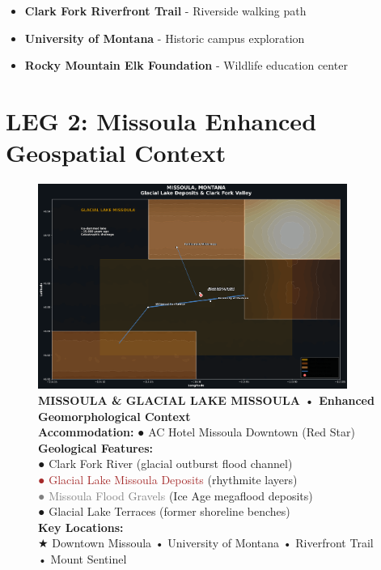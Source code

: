 \documentclass[
  11pt,
]{article}
\providecommand{\tightlist}{%
  \setlength{\itemsep}{0pt}\setlength{\parskip}{0pt}}
\begin{document}
\begin{itemize}
\tightlist
\item
  \textbf{\textcolor{secondary}{Clark Fork Riverfront Trail}} -
  Riverside walking path
\item
  \textbf{\textcolor{secondary}{University of Montana}} - Historic
  campus exploration
\item
  \textbf{\textcolor{secondary}{Rocky Mountain Elk Foundation}} -
  Wildlife education center
\end{itemize}

\newpage

\section{\texorpdfstring{\textcolor{primary}{LEG 2: Missoula Enhanced Geospatial Context}}{}}\label{section-16}

\begin{figure}[H]
\centering
\includegraphics[width=0.9\textwidth]{images/missoula_enhanced_geospatial.png}
\caption{\textbf{\textcolor{primary}{MISSOULA \& GLACIAL LAKE MISSOULA • Enhanced Geomorphological Context}} \\ 
\textbf{\textcolor{secondary}{Accommodation:}} \textcolor{mapred}{●} AC Hotel Missoula Downtown (Red Star) \\
\textbf{\textcolor{secondary}{Geological Features:}} \\
\textcolor{mapblue}{●} \textcolor{mapblue}{Clark Fork River} (glacial outburst flood channel) \\
\textcolor{brown}{●} \textcolor{brown}{Glacial Lake Missoula Deposits} (rhythmite layers) \\
\textcolor{gray}{●} \textcolor{gray}{Missoula Flood Gravels} (Ice Age megaflood deposits) \\
\textcolor{mapgreen}{●} \textcolor{mapgreen}{Glacial Lake Terraces} (former shoreline benches) \\
\textbf{\textcolor{secondary}{Key Locations:}} \\
\textcolor{mapred}{★} Downtown Missoula • University of Montana • Riverfront Trail • Mount Sentinel}
\end{figure}
\end{document}
